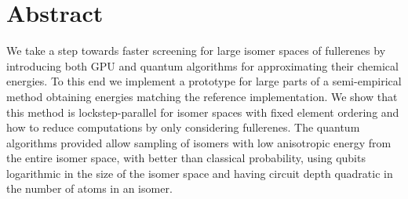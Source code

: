 \chapter*{Abstract}
We take a step towards faster screening for large isomer spaces of fullerenes by introducing both GPU and quantum algorithms for approximating their chemical energies. To this end we implement a prototype for large parts of a semi-empirical method obtaining energies matching the reference implementation. We show that this method is lockstep-parallel for isomer spaces with fixed element ordering and how to reduce computations by only considering fullerenes. The quantum algorithms provided allow sampling of isomers with low anisotropic energy from the entire isomer space, with better than classical probability, using qubits logarithmic in the size of the isomer space and having circuit depth quadratic in the number of atoms in an isomer. 
